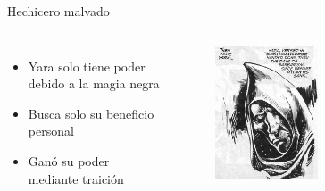 \begin{frame}{Hechicero malvado}
\begin{columns}
 \begin{itemize}
    \item Yara solo tiene poder debido a la magia negra
    \item Busca solo su beneficio personal
    \item Ganó su poder mediante traición
 \end{itemize}
    \begin{figure}[htb]
      \centering
      \includegraphics[width=0.5\textwidth]{img/tropes/malvado}
    \end{figure}
  \end{columns}
\end{frame}

